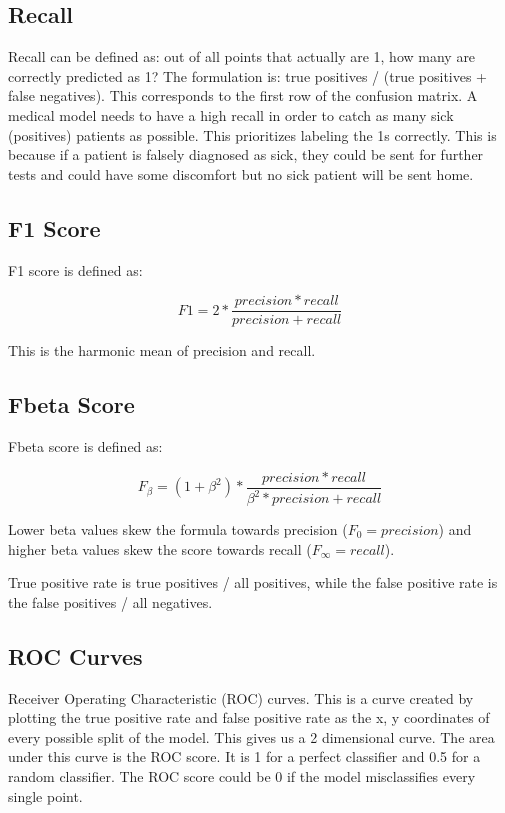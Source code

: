 \documentclass{article}
\begin{document}
\subsection{Recall}
Recall can be defined as: out of all points that actually are 1, how many are correctly predicted as 1? The formulation is: true positives / (true positives + false negatives). This corresponds to the first row of the confusion matrix. A medical model needs to have a high recall in order to catch as many sick (positives) patients as possible. This prioritizes labeling the 1s correctly. This is because if a patient is falsely diagnosed as sick, they could be sent for further tests and could have some discomfort but no sick patient will be sent home.

\subsection{F1 Score}
F1 score is defined as:

\begin{equation}
  F1 = 2 * \frac{precision * recall}{precision + recall}
\end{equation}

This is the harmonic mean of precision and recall.

\subsection{Fbeta Score}
Fbeta score is defined as:

\begin{equation}
  F_\beta = (1 + \beta^2) * \frac{precision * recall}{\beta^2 * precision + recall}
\end{equation}

Lower beta values skew the formula towards precision ($F_0 = precision$) and higher beta values skew the score towards recall ($F_\infty = recall$).

True positive rate is true positives / all positives, while the false positive rate is the false positives / all negatives.

\subsection{ROC Curves}
Receiver Operating Characteristic (ROC) curves. This is a curve created by plotting the true positive rate and false positive rate as the x, y coordinates of every possible split of the model. This gives us a 2 dimensional curve. The area under this curve is the ROC score. It is 1 for a perfect classifier and 0.5 for a random classifier. The ROC score could be 0 if the model misclassifies every single point.
\end{document}
